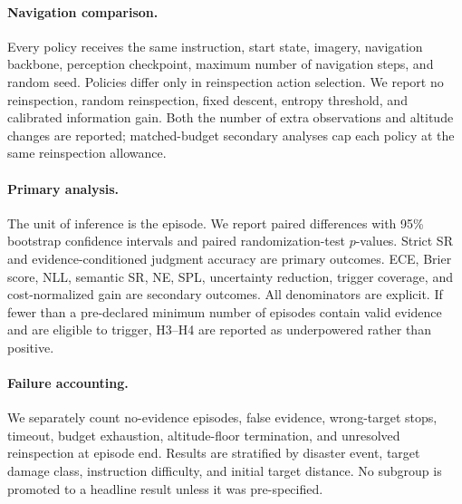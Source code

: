\paragraph{Navigation comparison.}
Every policy receives the same instruction, start state, imagery, navigation backbone, perception checkpoint, maximum number of navigation steps, and random seed.
Policies differ only in reinspection action selection.
We report no reinspection, random reinspection, fixed descent, entropy threshold, and calibrated information gain.
Both the number of extra observations and altitude changes are reported; matched-budget secondary analyses cap each policy at the same reinspection allowance.

\paragraph{Primary analysis.}
The unit of inference is the episode.
We report paired differences with 95\% bootstrap confidence intervals and paired randomization-test \(p\)-values.
Strict SR and evidence-conditioned judgment accuracy are primary outcomes.
ECE, Brier score, NLL, semantic SR, NE, SPL, uncertainty reduction, trigger coverage, and cost-normalized gain are secondary outcomes.
All denominators are explicit.
If fewer than a pre-declared minimum number of episodes contain valid evidence and are eligible to trigger, H3--H4 are reported as underpowered rather than positive.

\paragraph{Failure accounting.}
We separately count no-evidence episodes, false evidence, wrong-target stops, timeout, budget exhaustion, altitude-floor termination, and unresolved reinspection at episode end.
Results are stratified by disaster event, target damage class, instruction difficulty, and initial target distance.
No subgroup is promoted to a headline result unless it was pre-specified.
